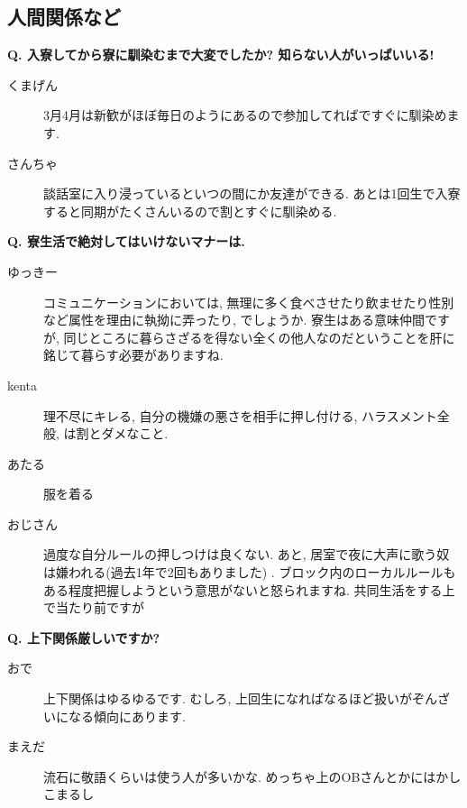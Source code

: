 \documentclass[10pt,b5jsbook,dvips,dvipdfmx,openany]{jsbook}
\theoremstyle{definition}
\begin{document}
		\subsection{人間関係など}

		\begin{tcolorbox}
		\textbf{Q. 入寮してから寮に馴染むまで大変でしたか? 知らない人がいっぱいいる!}
		\end{tcolorbox}

		\begin{description}
		\item[くまげん] 3月4月は新歓がほぼ毎日のようにあるので参加してればですぐに馴染めます.

		\item[さんちゃ] 談話室に入り浸っているといつの間にか友達ができる. あとは1回生で入寮すると同期がたくさんいるので割とすぐに馴染める.
		\end{description}
		\begin{tcolorbox}
		\textbf{Q. 寮生活で絶対してはいけないマナーは. }
		\end{tcolorbox}

		\begin{description}
		\item[ゆっきー]
		コミュニケーションにおいては, 無理に多く食べさせたり飲ませたり性別など属性を理由に執拗に弄ったり, でしょうか. 寮生はある意味仲間ですが, 同じところに暮らさざるを得ない全くの他人なのだということを肝に銘じて暮らす必要がありますね.
		\item[kenta]
		理不尽にキレる, 自分の機嫌の悪さを相手に押し付ける, ハラスメント全般, は割とダメなこと.
		\item[あたる]
		服を着る
		\item[おじさん]
		過度な自分ルールの押しつけは良くない. あと, 居室で夜に大声に歌う奴は嫌われる(過去1年で2回もありました) . ブロック内のローカルルールもある程度把握しようという意思がないと怒られますね. 共同生活をする上で当たり前ですが
		\end{description}

		\begin{tcolorbox}
		\textbf{Q. 上下関係厳しいですか?}
		\end{tcolorbox}
		\begin{description}
		\item[おで] 上下関係はゆるゆるです. むしろ, 上回生になればなるほど扱いがぞんざいになる傾向にあります.
		\item[まえだ] 流石に敬語くらいは使う人が多いかな. めっちゃ上のOBさんとかにはかしこまるし
		\end{description}
\end{document}
